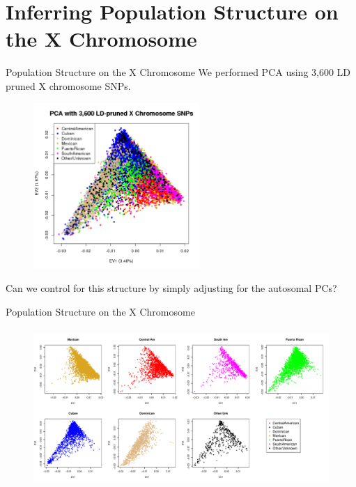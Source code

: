 \documentclass{beamer}
\begin{document}
\section{Inferring Population Structure on the X Chromosome}
\begin{frame}{Population Structure on the X Chromosome}
We performed PCA using 3,600 LD pruned X chromosome SNPs.
\begin{figure}
\centering
\includegraphics[height=6.3cm]{../pca_x_ev12_col.png}
\end{figure}
Can we control for this structure by simply adjusting for the autosomal PCs?
\end{frame}

\begin{frame}{Population Structure on the X Chromosome}
\begin{figure}
\includegraphics[height=6cm]{../pca_x_ev12_eachCol.pdf}
\end{figure}
\end{frame}
\end{document}
